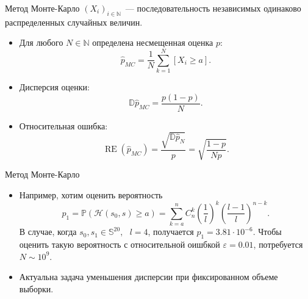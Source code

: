 \documentclass[pdf, 10pt, unicode]{beamer}
\DeclareMathOperator{\RE}{RE}
\begin{document}
\begin{frame}{Метод Монте-Карло}
    $(X_i)_{i\in\mathbb{N}}$~--- последовательность независимых одинаково распределенных случайных величин.

\begin{itemize}    
 \item Для любого $N\in\mathbb{N}$ определена несмещенная оценка $p$:
        \begin{equation*}
            \hat{p}_{MC} = \frac{1}{N} \sum\limits_{k = 1}^{N}{[X_i \geq a]}.
        \end{equation*}
 \item Дисперсия оценки: 
    \begin{equation*}
        \mathbb{D}\hat{p}_{MC} = \frac{p(1-p)}{N}.
    \end{equation*}
 \item Относительная ошибка: 
    \begin{equation*}
        \RE(\hat{p}_{MC}) = \frac{\sqrt{\mathbb{D}\hat{p}_N}}{p} = \sqrt{\frac{1-p}{Np}}.
    \end{equation*}
\end{itemize}
    
\end{frame}


\begin{frame}{Метод Монте-Карло}
    \begin{itemize}
		
		 относительной ошибки $\varepsilon$ получаем требуемый порядок объема выборки:
			\begin{equation*}
				N\sim \frac{1-p}{\varepsilon^2p}.
			\end{equation*}
        \item Например, хотим оценить вероятность 
        \begin{equation*}
            p_1 = \mathbb{P}(\mathcal{H}(s_0, s)\geq a) = \sum\limits_{k = a}^{n}{C_n^k \left( \frac{1}{l} \right)^k\left( \frac{l-1}{l} \right)^{n-k}}.
        \end{equation*}
        В случае, когда $s_0, s_1 \in \mathbb{S}^{20}, \text{ } l = 4$, получается $p_1 = 3.81\cdot10^{-6}$. Чтобы оценить такую вероятность с относительной оишбкой $\varepsilon = 0.01$, потребуется $N\sim 10^9$.
        \item Актуальна задача уменьшения дисперсии при фиксированном объеме выборки. 
        \end{itemize}
    
\end{frame}
\end{document}
